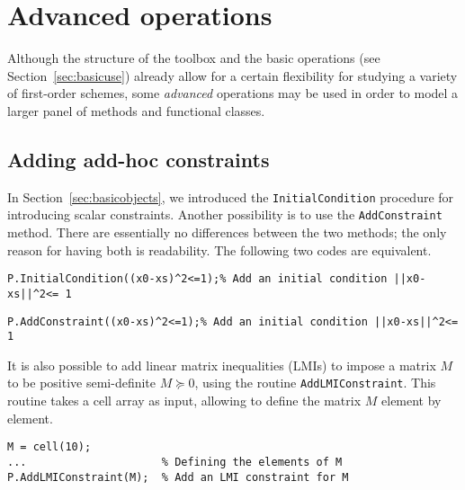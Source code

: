 \documentclass[11pt,a4paper]{article}
\begin{document}
					\section{Advanced operations}		%

					Although the structure of the toolbox and the basic operations (see Section~\ref{sec:basicuse}) already allow for a certain flexibility for studying a variety of first-order schemes, some \emph{advanced} operations may be used in order to model a larger panel of methods and functional classes.

					\subsection{Adding add-hoc constraints}\label{sec:constraints}
					In Section~\ref{sec:basicobjects}, we introduced the \verb?InitialCondition? procedure for introducing scalar constraints. Another possibility is to use the \verb?AddConstraint? method. There are essentially no differences between the two methods; the only reason for having both is readability. The following two codes are equivalent.\\[-1cm]
					\begin{lstlisting}
P.InitialCondition((x0-xs)^2<=1);% Add an initial condition ||x0-xs||^2<= 1
					\end{lstlisting}\vspace{-.5cm}
					\begin{lstlisting}
P.AddConstraint((x0-xs)^2<=1);% Add an initial condition ||x0-xs||^2<= 1
					\end{lstlisting}
					It is also possible to add linear matrix inequalities (LMIs) to impose a matrix $M$ to be positive semi-definite $M \succeq 0$, using the routine \verb?AddLMIConstraint?. This routine takes a cell array as input, allowing to define the matrix $M$ element by element. \\[-1cm] %
					\begin{lstlisting}
M = cell(10); 	
... 					% Defining the elements of M
P.AddLMIConstraint(M);	% Add an LMI constraint for M 
					\end{lstlisting}
\end{document}

